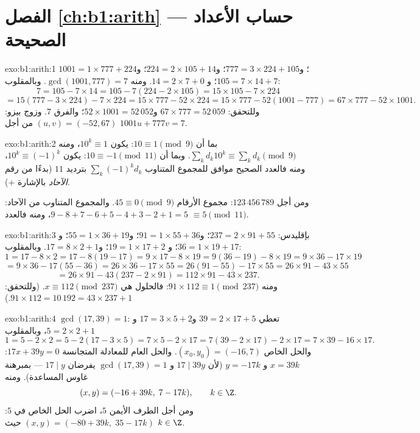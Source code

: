 \section*{الفصل \ref{ch:b1:arith} --- حساب الأعداد الصحيحة}

\begin{solution}{exo:b1:arith:1}
$1001 = 1 \times 777 + 224$؛ و$777 = 3 \times 224 + 105$؛ و$224 = 2
\times 105 + 14$؛ و$105 = 7 \times 14 + 7$؛ و $14 = 2 \times 7 + 0$. ومنه
$\gcd(1001, 777) = 7$. وبالمقلوب:
\[
7 = 105 - 7 \times 14
= 105 - 7(224 - 2\times 105) = 15 \times 105 - 7 \times 224
\]
\[
= 15(777 - 3\times 224) - 7\times 224 = 15 \times 777 - 52 \times 224
= 15 \times 777 - 52(1001 - 777) = 67 \times 777 - 52 \times 1001 .
\]
وللتحقق: $67 \times 777 = 52\,059$ و$52 \times 1001 = 52\,052$؛
والفرق $7$. وزوج بيزو: $(u, v) = (-52, 67)$ من أجل $1001u + 777v =
7$.
\end{solution}

\begin{solution}{exo:b1:arith:2}
بما أن $10 \equiv 1 \pmod 9$: يكون $10^k \equiv 1$، ومنه $\sum_k d_k 10^k
\equiv \sum_k d_k \pmod 9$. وبما أن $10 \equiv -1 \pmod{11}$: يكون $10^k
\equiv (-1)^k$، ومنه فالعدد الصحيح موافق للمجموع المتناوب
$\sum_k (-1)^k d_k$ بترديد $11$ (بدءًا من رقم \emph{الآحاد}
بالإشارة $+$).

ومن أجل $123\,456\,789$: مجموع الأرقام $45 \equiv 0 \pmod 9$. والمجموع المتناوب من
الآحاد: $9 - 8 + 7 - 6 + 5 - 4 + 3 - 2 + 1 = 5$، ومنه فالعدد
$\equiv 5 \pmod{11}$.
\end{solution}

\begin{solution}{exo:b1:arith:3}
بإقليدس: $237 = 2 \times 91 + 55$؛ و$91 = 1 \times 55 + 36$؛ و$55 = 1
\times 36 + 19$؛ و$36 = 1 \times 19 + 17$؛ و $19 = 1 \times 17 + 2$؛ و$17
= 8 \times 2 + 1$. وبالمقلوب:
\[
1 = 17 - 8\times 2 = 17 - 8(19 - 17) = 9\times 17 - 8\times 19
= 9(36 - 19) - 8\times 19 = 9\times 36 - 17\times 19
\]
\[
= 9\times 36 - 17(55 - 36) = 26\times 36 - 17\times 55
= 26(91 - 55) - 17\times 55 = 26\times 91 - 43\times 55
\]
\[
= 26\times 91 - 43(237 - 2\times 91) = 112 \times 91 - 43 \times 237.
\]
ومنه $91 \times 112 \equiv 1 \pmod{237}$: فالحلول هي $x \equiv
112 \pmod{237}$. (وللتحقق: $91 \times 112 = 10\,192 = 43 \times 237 +
1$.)
\end{solution}

\begin{solution}{exo:b1:arith:4}
$\gcd(17, 39) = 1$: تعطي  $39 = 2\times 17 + 5$ و$17 = 3\times
5 + 2$ و $5 = 2\times 2 + 1$، وبالمقلوب
\[
1 = 5 - 2\times 2 = 5 - 2(17 - 3\times 5) = 7\times 5 - 2\times 17
= 7(39 - 2\times 17) - 2\times 17 = 7\times 39 - 16\times 17 .
\]
والحل الخاص $(x_0, y_0) = (-16, 7)$. والحل العام للمعادلة
المتجانسة $17x + 39y = 0$: $x = 39k$ و $y = -17k$ (لأن
$17 \mid 39y$ و $\gcd(17,39) = 1$ يفرضان $17 \mid y$ ---
بمبرهنة غاوس المساعدة). ومنه
\[
(x, y) = (-16 + 39k,\; 7 - 17k), \qquad k \in \Z .
\]
ومن أجل الطرف الأيمن $5$، اضرب الحل الخاص في $5$:
$(x, y) = (-80 + 39k,\; 35 - 17k)$ حيث $k \in \Z$.
\end{solution}

